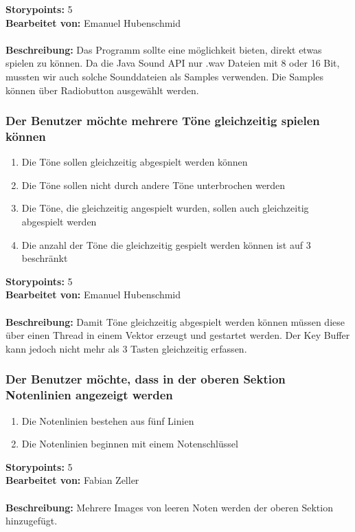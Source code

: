 \textbf{Storypoints:} 5 \\
\textbf{Bearbeitet von:} Emanuel Hubenschmid \\
\\
\textbf{Beschreibung:} Das Programm sollte eine möglichkeit bieten, direkt etwas spielen zu können. 
Da die Java Sound API nur .wav Dateien mit 8 oder 16 Bit, mussten wir auch solche Sounddateien als 
Samples verwenden. Die Samples können über Radiobutton ausgewählt werden.


\subsubsection{Der Benutzer möchte mehrere Töne gleichzeitig spielen können}

\begin{enumerate}
 \item Die Töne sollen gleichzeitig abgespielt werden können
 \item Die Töne sollen nicht durch andere Töne unterbrochen werden
 \item Die Töne, die gleichzeitig angespielt wurden, sollen auch gleichzeitig abgespielt werden
 \item Die  anzahl der Töne die gleichzeitig gespielt werden können ist auf 3 beschränkt
\end{enumerate}

\textbf{Storypoints:} 5 \\
\textbf{Bearbeitet von:} Emanuel Hubenschmid \\
\\
\textbf{Beschreibung:} Damit Töne gleichzeitig abgespielt werden können müssen diese über 
einen Thread in einem Vektor erzeugt und gestartet werden. Der Key Buffer kann jedoch nicht 
mehr als 3 Tasten gleichzeitig erfassen.


\subsubsection{Der Benutzer möchte, dass in der oberen Sektion Notenlinien angezeigt werden}

\begin{enumerate}
 \item Die Notenlinien bestehen aus fünf Linien
 \item Die Notenlinien beginnen mit einem Notenschlüssel
\end{enumerate}

\textbf{Storypoints:} 5 \\
\textbf{Bearbeitet von:} Fabian Zeller \\
\\
\textbf{Beschreibung:} Mehrere Images von leeren Noten werden der oberen Sektion hinzugefügt.


